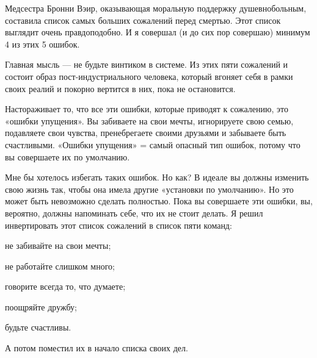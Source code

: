 \documentclass[ebook,12pt,oneside,openany]{memoir}
\begin{document}
\maketitle

Медсестра Бронни Вэир, оказывающая моральную поддержку душевнобольным,
составила список самых больших сожалений перед смертью. Этот список
выглядит очень правдоподобно. И я совершал (и до сих пор совершаю)
минимум 4 из этих 5 ошибок.

Главная мысль — не будьте винтиком в системе. Из этих пяти сожалений и
состоит образ пост-индустриального человека, который вгоняет себя в
рамки своих реалий и покорно вертится в них, пока не остановится.

Настораживает то, что все эти ошибки, которые приводят к сожалению,
это «ошибки упущения». Вы забиваете на свои мечты, игнорируете свою
семью, подавляете свои чувства, пренебрегаете своими друзьями и
забываете быть счастливыми. «Ошибки упущения» = самый опасный тип
ошибок, потому что вы совершаете их по умолчанию.

Мне бы хотелось избегать таких ошибок. Но как? В идеале вы должны
изменить свою жизнь так, чтобы она имела другие «установки по
умолчанию». Но это может быть невозможно сделать полностью. Пока вы
совершаете эти ошибки, вы, вероятно, должны напоминать себе, что их не
стоит делать. Я решил инвертировать этот список сожалений в список
пяти команд:

не забивайте на свои мечты;

не работайте слишком много;

говорите всегда то, что думаете;

поощряйте дружбу;

будьте счастливы.

А потом поместил их в начало списка своих дел.
\end{document}
